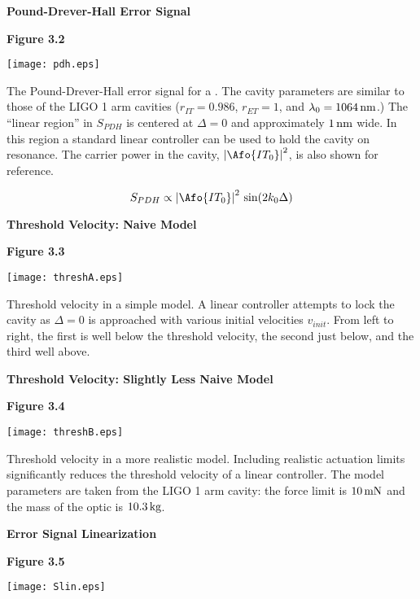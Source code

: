 \documentclass[12pt]{article}
\newcommand{\tit}[1]{\begin{center}\textbf{\Huge{#1}}\end{center}\vspace{1ex}}
\newcommand{\fig}[1]{\textbf{\large{Figure #1}}}
\begin{document}
\tit{Pound-Drever-Hall Error Signal}
\fig{3.2}

\begin{center}
\texttt{[image: pdh.eps]}
\end{center}

The Pound-Drever-Hall error signal for a \FPC.
 The cavity parameters are similar to those of the LIGO 1 arm
  cavities ($r_{IT} = 0.986$, $r_{ET} = 1$, and $\lambda_0 = 1064\,\mbox{nm}$.)
 The ``linear region'' in $S_{PDH}$  is centered at $\Delta = 0$ and
  approximately $1\,\mbox{nm}$ wide.
 In this region a standard linear controller can be used to
  hold the cavity on resonance.
 The carrier power in the cavity,
  $\abs{\Afo{IT_0}}^2$, is also shown for reference.

\begin{equation}
S_{PDH} \propto \abs{\Afo{IT_0}}^2 \fsin{2 \wn_0 \Delta}
\end{equation}


\newpage
\tit{Threshold Velocity: Naive Model}

\fig{3.3}

\begin{center}
\texttt{[image: threshA.eps]}
\end{center}

 Threshold velocity in a simple \la{} model.
 A linear controller attempts to lock the cavity as
  $\Delta = 0$ is approached with various initial velocities
  $v_{init}$.
 From left to right, the first is well below the threshold velocity,
  the second just below, and the third well above.

\newpage
\tit{Threshold Velocity: Slightly Less Naive Model}

\fig{3.4}

\begin{center}
\texttt{[image: threshB.eps]}
\end{center}

 Threshold velocity in a more realistic \la{} model.
 Including realistic actuation limits significantly
  reduces the threshold velocity of a linear controller.
 The model parameters are taken from the LIGO 1 arm cavity:
  the force limit is $10 \,\mbox{mN}$
  and the mass of the optic is $10.3 \,\mbox{kg}$.

\newpage
\tit{Error Signal Linearization}

\fig{3.5}

\begin{center}
\texttt{[image: Slin.eps]}
\end{center}
\end{document}
